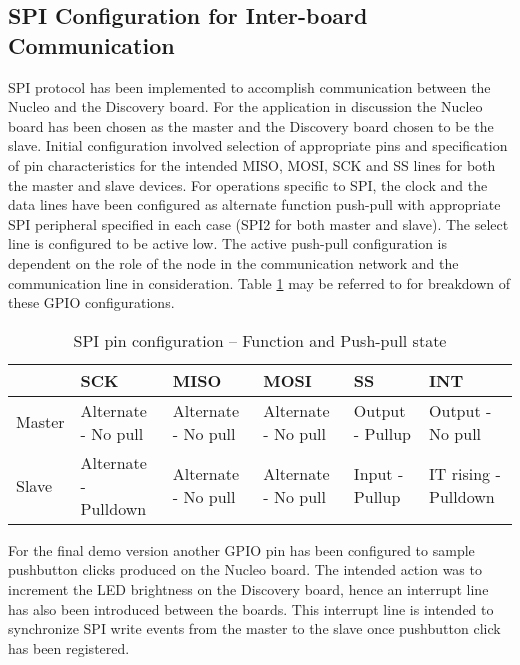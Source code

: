 \subsection{SPI Configuration for Inter-board Communication}
SPI protocol has been implemented to accomplish communication between the Nucleo and the Discovery board. For the application in discussion the Nucleo board has been chosen as the master and the Discovery board chosen to be the slave. Initial configuration involved selection of appropriate pins and specification of pin characteristics for the intended MISO, MOSI, SCK and SS lines for both the master and slave devices. For operations specific to SPI, the clock and the data lines have been configured as alternate function push-pull with appropriate SPI peripheral specified in each case (SPI2 for both master and slave). The select line is configured to be active low. The active push-pull configuration is dependent on the role of the node in the communication network and the communication line in consideration. Table \ref{table:pin_config} may be referred to for breakdown of these GPIO configurations. 

\begin{table}[!htbp]
\centering
\caption{SPI pin configuration -- Function and Push-pull state}
\label{table:pin_config}
\begin{tabular}{|p{2cm}|p{2cm}|p{2cm}|p{2cm}|p{2cm}|p{2cm}|}
\hline
       & SCK                  & MISO                & MOSI                & SS              & INT                  \\ \hline
Master & Alternate - No pull  & Alternate - No pull & Alternate - No pull & Output - Pullup & Output - No pull     \\ \hline
Slave  & Alternate - Pulldown & Alternate - No pull & Alternate - No pull & Input - Pullup  & IT rising - Pulldown \\ \hline
\end{tabular}
\end{table}

For the final demo version another GPIO pin has been configured to sample pushbutton clicks produced on the Nucleo board. The intended action was to increment the LED brightness on the Discovery board, hence an interrupt line has also been introduced between the boards. This interrupt line is intended to synchronize SPI write events from the master to the slave once pushbutton click has been registered. 

